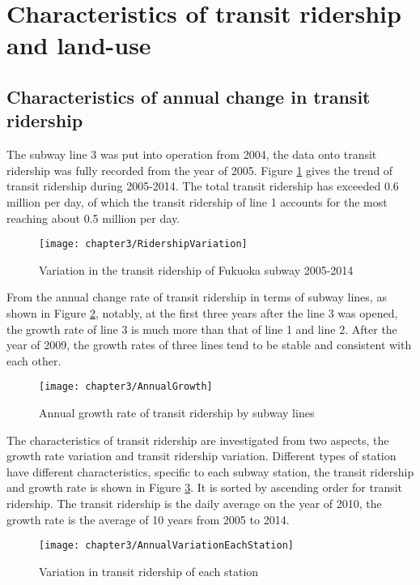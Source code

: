 %
\section{Characteristics of transit ridership and land-use}
%
\subsection{Characteristics of annual change in transit ridership}
%
The subway line 3 was put into operation from 2004, the data onto transit ridership was fully recorded from the year of 2005. Figure \ref{fig:chp3:RidershipVariation} gives the trend of transit ridership during 2005-2014. The total transit ridership has exceeded 0.6 million per day, of which the transit ridership of line 1 accounts for the most reaching about 0.5 million per day.

\begin{figure}[htbp]
	\centering
	\texttt{[image: chapter3/RidershipVariation]}
	\caption{Variation in the transit ridership of Fukuoka subway 2005-2014}
	\label{fig:chp3:RidershipVariation}
\end{figure}

%
From the annual change rate of transit ridership in terms of subway lines, as shown in Figure \ref{fig:chp3:AnnualGrowth}, notably, at the first three years after the line 3 was opened, the growth rate of line 3 is much more than that of line 1 and line 2. After the year of 2009, the growth rates of three lines tend to be stable and consistent with each other.

%
\begin{figure}[htbp]
	\centering
	\texttt{[image: chapter3/AnnualGrowth]}
	\caption{Annual growth rate of transit ridership by subway lines}
	\label{fig:chp3:AnnualGrowth}
\end{figure}

%
The characteristics of transit ridership are investigated from two aspects, the growth rate variation and transit ridership variation. Different types of station have different characteristics, specific to each subway station, the transit ridership and growth rate is shown in Figure \ref{fig:chp3:AnnualVariationEachStation}. It is sorted by ascending order for transit ridership. The transit ridership is the daily average on the year of 2010, the growth rate is the average of 10 years from 2005 to 2014. 

%
\begin{figure}[htbp]
	\centering
	\texttt{[image: chapter3/AnnualVariationEachStation]}
	\caption{Variation in transit ridership of each station}
	\label{fig:chp3:AnnualVariationEachStation}
\end{figure}

